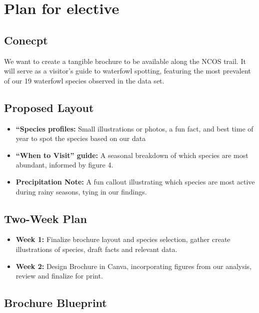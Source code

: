 \documentclass[
  letterpaper,
  DIV=11,
  numbers=noendperiod]{scrartcl}
\begin{document}
\section{Plan for elective}\label{plan-for-elective}

\subsection{Conecpt}\label{conecpt}

We want to create a tangible brochure to be available along the NCOS
trail. It will serve as a visitor's guide to waterfowl spotting,
featuring the most prevalent of our 19 waterfowl species observed in the
data set.

\subsection{Proposed Layout}\label{proposed-layout}

\begin{itemize}
\item
  \textbf{``Species profiles:} Small illustrations or photos, a fun
  fact, and best time of year to spot the species based on our data
\item
  \textbf{``When to Visit'' guide:} A seasonal breakdown of which
  species are most abundant, informed by figure 4.
\item
  \textbf{Precipitation Note:} A fun callout illustrating which species
  are most active during rainy seasons, tying in our findings.
\end{itemize}

\subsection{Two-Week Plan}\label{two-week-plan}

\begin{itemize}
\item
  \textbf{Week 1:} Finalize brochure layout and species selection,
  gather create illustrations of species, draft facts and relevant data.
\item
  \textbf{Week 2:} Design Brochure in Canva, incorporating figures from
  our analysis, review and finalize for print.
\end{itemize}

\subsection{Brochure Blueprint}\label{brochure-blueprint}
\end{document}
